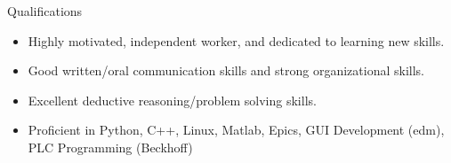 \documentclass{resume} %
\begin{document}
\begin{rSection}{Qualifications}

\begin{itemize}
    \item Highly motivated, independent worker, and dedicated to learning new skills.
    \item Good written/oral communication skills and strong organizational skills.
    \item Excellent deductive reasoning/problem solving skills.
    \item Proficient in Python, C++, Linux, Matlab, Epics, GUI Development (edm), PLC Programming (Beckhoff)
\end{itemize}

\end{rSection}

\end{document}
